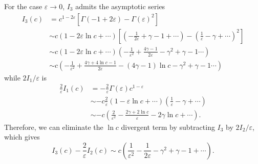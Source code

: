 \begin{solution}
     For the case $\varepsilon\to0$, $I_3$ admits the asymptotic series
     \begin{equation}
     \begin{aligned}
         I_3(c) &= c^{1-2\varepsilon}          [\Gamma(-1+2\varepsilon) -\Gamma(\varepsilon)^2] \\
         &\sim c(1-2\varepsilon\ln c+\cdots)\left[\left(-\frac{1}{2\varepsilon} + \gamma - 1 + \cdots\right) - \left(\frac{1}{\varepsilon} - \gamma+\cdots\right)^2\right]\\
         &\sim c(1-2\varepsilon\ln c+\cdots)\left(-\frac{1}{\varepsilon^2} +\frac{4\gamma - 1}{2\varepsilon} -\gamma^2 + \gamma-1 \cdots \right)\\
         &\sim c\left(-\frac{1}{\varepsilon^2} +\frac{4\gamma +4\ln c - 1}{2\varepsilon}  - (4\gamma-1)\ln c-\gamma^2 + \gamma-1 \cdots \right)
     \end{aligned}
     \end{equation}
     while $2I_1/\varepsilon$ is
     \begin{equation}
        \begin{aligned}
            \frac{2}{\varepsilon}I_1(c) &=-\frac{2}{\varepsilon}\Gamma(\varepsilon)c^{1-\varepsilon}\\
            &\sim -c\frac{2}{\varepsilon}(1-\varepsilon\ln c +  \cdots)\left(\frac{1}{\varepsilon} - \gamma+\cdots \right)\\
            &\sim -c\left(\frac{2}{\varepsilon^2}- \frac{2\gamma + 2\ln c}{\varepsilon} - 2\gamma\ln c + \cdots\right).
        \end{aligned}
     \end{equation}
     Therefore, we can eliminate the $\ln c$ divergent term by subtracting $I_3$ by $2I_2/\varepsilon$, which gives
     \begin{equation}
         I_3(c) - \frac{2}{\varepsilon} I_2(c) \sim  c\left(\frac{1}{\varepsilon^2}- \frac{1}{2\varepsilon} - \gamma^2 + \gamma -1 + \cdots\right).
     \end{equation}
\end{solution}
